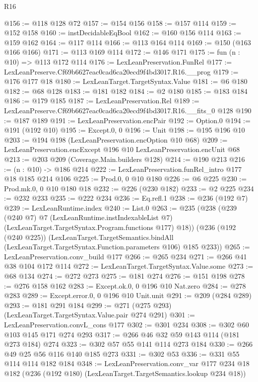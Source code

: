 \begin{lexlean}{R16}
\begin{coremodule}
@156 := @118 @128 @72
@157 := @154 @156
@158 := @157 @114
@159 := @152 @158
@160 := instDecidableEqBool
@162 := @160 @156 @114
@163 := @159 @162
@164 := @117 @114
@166 := @113 @164 @114
@169 := @150 (@163 @166 @166)
@171 := @113 @169 @114
@172 := @146 @171
@175 := fun (n : @10) => @113 @172 @114
@176 := LexLeanPreservation.FunRel
@177 := LexLeanPreserve.Cf69b6627eac0cad6ca20ecd9f4bd3017.R16.__prog
@179 := @176 @177 @18
@180 := LexLeanTarget.TargetSyntax.Value
@181 := @6 @180
@182 := @68 @128
@183 := @181 @182
@184 := @2 @180
@185 := @183 @184
@186 := @179 @185
@187 := LexLeanPreservation.Rel
@189 := LexLeanPreserve.Cf69b6627eac0cad6ca20ecd9f4bd3017.R16.__fits_0 @128
@190 := @187 @189
@191 := LexLeanPreservation.encPair
@192 := Option.{0}
@194 := @191 (@192 @10)
@195 := Except.{0, 0}
@196 := Unit
@198 := @195 @196 @10
@203 := @194 @198 (LexLeanPreservation.encOption @10 @68)
@209 := LexLeanPreservation.encExcept @196 @10 LexLeanPreservation.encUnit @68
@213 := @203 @209 (Coverage.Main.builders @128)
@214 := @190 @213
@216 := (n : @10) -> @186 @214
@222 := LexLeanPreservation.funRel_intro @177 @18 @185 @214 @106
@225 := Prod.{0, 0} @10 @180
@226 := @6 @225
@230 := Prod.mk.{0, 0} @10 @180 @18
@232 := @226 (@230 @182)
@233 := @2 @225
@234 := @232 @233
@235 := @222 @234
@236 := Eq.refl.{1}
@238 := @236 (@192 @7)
@239 := LexLeanRuntime.index
@240 := List.{0}
@263 := @235
    (@238
      (@239
        (@240 @7)
        @7
        (LexLeanRuntime.instIndexableList @7)
        (LexLeanTarget.TargetSyntax.Program.functions @177)
        @18))
    (@236
      (@192 (@240 @225))
      (LexLeanTarget.TargetSemantics.bindAll
        (LexLeanTarget.TargetSyntax.Function.parameters @106)
        @185
        @233))
@265 := LexLeanPreservation.conv_build @177
@266 := @265 @234
@271 := @266 @41 @38 @104 @172 @114
@272 := LexLeanTarget.TargetSyntax.Value.some
@273 := @68 @134
@274 := @272 @273
@275 := @181 @274
@276 := @151 @198
@278 := @276 @158 @162
@283 := Except.ok.{0, 0} @196 @10 Nat.zero
@284 := @278 @283
@289 := Except.error.{0, 0} @196 @10 Unit.unit
@291 := @209 (@284 @289)
@293 := @181 @291 @184
@299 := @271 (@275 @293) (LexLeanTarget.TargetSyntax.Value.pair @274 @291)
@301 := LexLeanPreservation.convL_cons @177
@302 := @301 @234
@308 := @302 @60 @103 @145 @171 @274 @293
@317 := @266 @46 @32 @59 @143 @114 (@181 @273 @184) @274
@323 := @302 @57 @55 @141 @114 @273 @184
@330 := @266 @49 @25 @56 @116 @140 @185 @273
@331 := @302 @53
@336 := @331 @55 @114 @114 @182 @184
@348 := LexLeanPreservation.conv_var
    @177
    @234
    @18
    @182
    (@236 (@192 @180) (LexLeanTarget.TargetSemantics.lookup @234 @18))

\end{coremodule}
\end{lexlean}
